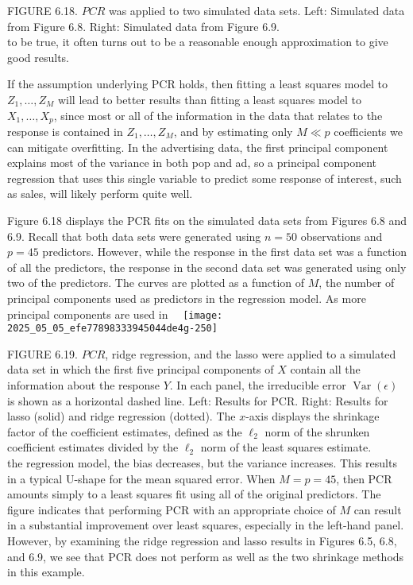 \documentclass[10pt]{article}
\begin{document}
FIGURE 6.18. $P C R$ was applied to two simulated data sets. Left: Simulated data from Figure 6.8. Right: Simulated data from Figure 6.9.\\
to be true, it often turns out to be a reasonable enough approximation to give good results.

If the assumption underlying PCR holds, then fitting a least squares model to $Z_{1}, \ldots, Z_{M}$ will lead to better results than fitting a least squares model to $X_{1}, \ldots, X_{p}$, since most or all of the information in the data that relates to the response is contained in $Z_{1}, \ldots, Z_{M}$, and by estimating only $M \ll p$ coefficients we can mitigate overfitting. In the advertising data, the first principal component explains most of the variance in both pop and ad, so a principal component regression that uses this single variable to predict some response of interest, such as sales, will likely perform quite well.

Figure 6.18 displays the PCR fits on the simulated data sets from Figures 6.8 and 6.9. Recall that both data sets were generated using $n=50$ observations and $p=45$ predictors. However, while the response in the first data set was a function of all the predictors, the response in the second data set was generated using only two of the predictors. The curves are plotted as a function of $M$, the number of principal components used as predictors in the regression model. As more principal components are used in\
\
\texttt{[image: 2025\_05\_05\_efe77898333945044de4g-250]}

FIGURE 6.19. $P C R$, ridge regression, and the lasso were applied to a simulated data set in which the first five principal components of $X$ contain all the information about the response $Y$. In each panel, the irreducible error $\operatorname{Var}(\epsilon)$ is shown as a horizontal dashed line. Left: Results for PCR. Right: Results for lasso (solid) and ridge regression (dotted). The $x$-axis displays the shrinkage factor of the coefficient estimates, defined as the $\ell_{2}$ norm of the shrunken coefficient estimates divided by the $\ell_{2}$ norm of the least squares estimate.\\
the regression model, the bias decreases, but the variance increases. This results in a typical U-shape for the mean squared error. When $M=p=45$, then PCR amounts simply to a least squares fit using all of the original predictors. The figure indicates that performing PCR with an appropriate choice of $M$ can result in a substantial improvement over least squares, especially in the left-hand panel. However, by examining the ridge regression and lasso results in Figures 6.5, 6.8, and 6.9, we see that PCR does not perform as well as the two shrinkage methods in this example.
\end{document}
